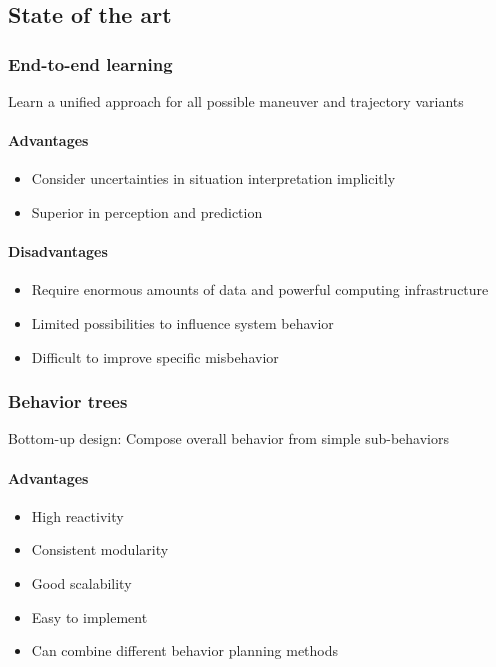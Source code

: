 \subsection{State of the art}

\subsubsection*{End-to-end learning}
Learn a unified approach for all possible maneuver and trajectory variants \cite{casas_mp3_2021}

\paragraph*{Advantages}
        \begin{itemize}
            \item Consider uncertainties in situation interpretation implicitly
            \item Superior in perception and prediction
        \end{itemize}
\paragraph*{Disadvantages}
        \begin{itemize}
            \item Require enormous amounts of data and powerful computing infrastructure
            \item Limited possibilities to influence system behavior
            \item Difficult to improve specific misbehavior
        \end{itemize}

\subsubsection*{Behavior trees}
Bottom-up design: Compose overall behavior from simple sub-behaviors \cite{brooks_robust_1986}

\paragraph*{Advantages}
        \begin{itemize}
            \item High reactivity
            \item Consistent modularity
            \item Good scalability
            \item Easy to implement
            \item Can combine different behavior planning methods
        \end{itemize}
